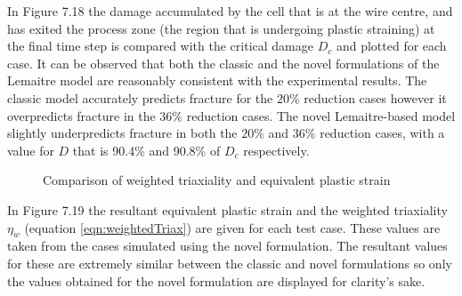 \documentclass[sn-mathphys,Numbered,draft]{sn-jnl}%
\begin{document}
In Figure 7.18 the damage accumulated by the cell that is at the wire centre, and has exited the process zone (the region that is undergoing plastic straining) at the final time step is compared with the critical damage $D_c$ and plotted for each case. It can be observed that both the classic and the novel formulations of the Lemaitre model are reasonably consistent with the experimental results. The classic model accurately predicts fracture for the $20\%$ reduction cases however it overpredicts fracture in the $36\%$ reduction cases. The novel Lemaitre-based model slightly underpredicts fracture in both the $20\%$ and $36\%$ reduction cases, with a value for $D$ that is 90.4\% and 90.8\% of $D_c$ respectively.

\begin{figure}[t!]
	\centering
	  \qquad
		\caption{Comparison of weighted triaxiality and equivalent plastic strain}
	\label{label_for_entire_figure}
\end{figure}
\FloatBarrier

In Figure 7.19 the resultant equivalent plastic strain and the weighted triaxiality $\eta_{w}$ (equation \ref{eqn:weightedTriax}) are given for each test case. These values are taken from the cases simulated using the novel formulation. The resultant values for these are extremely similar between the classic and novel formulations so only the values obtained for the novel formulation are displayed for clarity's sake.
\end{document}
